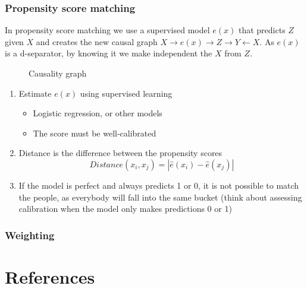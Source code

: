 \subsubsection{Propensity score matching}

In propensity score matching we use a supervised model $e(x)$ that predicts $Z$
given $X$ and creates the new causal graph $X \to e(x) \to Z \to Y \leftarrow
X$. As $e(x)$ is a d-separator, by knowing it we make independent the $X$ from
$Z$.

\begin{figure}[h]
  \centering
  \caption{Causality graph}
\end{figure}

\begin{enumerate}
  \item Estimate $e(x)$ using supervised learning
    \begin{itemize}
      \item Logistic regression, or other models
      \item The score must be well-calibrated
    \end{itemize}
  \item Distance is the difference between the propensity scores
    \begin{equation}
      Distance(x_i, x_j) = |\hat{e}(x_i) - \hat{e}(x_j)|
    \end{equation}
  \item If the model is perfect and always predicts 1 or 0, it is not possible
    to match the people, as everybody will fall into the same bucket (think
    about assessing calibration when the model only makes predictions 0 or 1)
\end{enumerate}

\subsubsection{Weighting}

\section{References}

